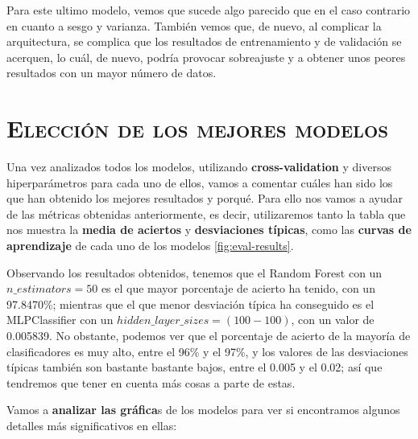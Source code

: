 \documentclass[11pt,a4paper]{article}
\begin{document}
Para este ultimo modelo, vemos que sucede algo parecido que en el caso contrario en cuanto a sesgo y varianza. También vemos que, de nuevo, al
complicar la arquitectura, se complica que los resultados de entrenamiento y de validación se acerquen, lo cuál, de nuevo, podría provocar sobreajuste
y a obtener unos peores resultados con un mayor número de datos.

\newpage

\section{\textsc{Elección de los mejores modelos}}

Una vez analizados todos los modelos, utilizando \textbf{cross-validation} y diversos hiperparámetros para cada uno de ellos, vamos a
comentar cuáles han sido los que han obtenido los mejores resultados y porqué. Para ello nos vamos a ayudar de las métricas obtenidas
anteriormente, es decir, utilizaremos tanto la tabla que nos muestra la \textbf{media de aciertos} y \textbf{desviaciones típicas}, como
las \textbf{curvas de aprendizaje} de cada uno de los modelos \ref{fig:eval-results}.

Observando los resultados obtenidos, tenemos que el Random Forest con un $n\_estimators = 50$ es el que mayor porcentaje de acierto ha
tenido, con un 97.8470\%; mientras que el que menor desviación típica ha conseguido es el MLPClassifier con un $hidden\_layer\_sizes =
(100-100)$, con un valor de 0.005839. No obstante, podemos ver que el porcentaje de acierto de la mayoría de clasificadores es muy alto,
entre el 96\% y el 97\%, y los valores de las desviaciones típicas también son bastante bastante bajos, entre el 0.005 y el 0.02; así que
tendremos que tener en cuenta más cosas a parte de estas.

Vamos a \textbf{analizar las gráfica}s de los modelos para ver si encontramos algunos detalles más significativos en ellas:
\end{document}
